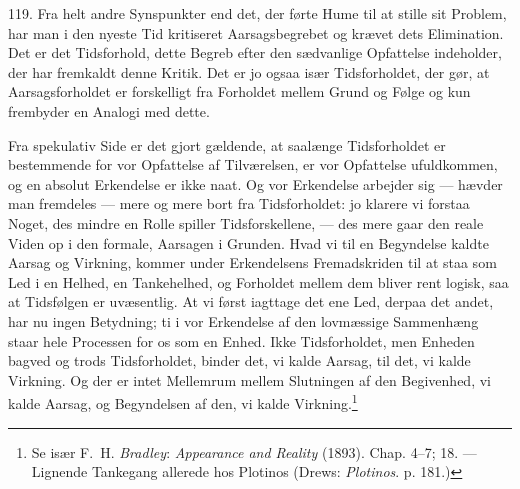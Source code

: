 \documentclass[12pt,a4paper]{book}
\newcommand{\apage}[1]{\marginnote{\footnotesize\textit{[#1]}}}
\begin{document}
119. Fra helt andre Synspunkter end det, der førte Hume til at stille sit Problem,
har man i den nyeste Tid kritiseret Aarsagsbegrebet og krævet dets Elimination. Det
er det Tidsforhold, dette Begreb efter den sædvanlige Opfattelse indeholder, der har
fremkaldt denne Kritik. Det er jo ogsaa især Tidsforholdet, der gør, at
Aarsagsforholdet er forskelligt fra Forholdet mellem Grund og Følge og kun frembyder
en Analogi med dette.

Fra spekulativ Side er det gjort gældende, at saalænge \apage{283} Tidsforholdet er bestemmende
for vor Opfattelse af Tilværelsen, er vor Opfattelse ufuldkommen, og en absolut
Erkendelse er ikke naat. Og vor Erkendelse arbejder sig --- hævder man fremdeles ---
mere og mere bort fra Tidsforholdet: jo klarere vi forstaa Noget, des mindre en
Rolle spiller Tidsforskellene, --- des mere gaar den reale Viden op i den formale,
Aarsagen i Grunden. Hvad vi til en Begyndelse kaldte Aarsag og Virkning, kommer
under Erkendelsens Fremadskriden til at staa som Led i en Helhed, en Tankehelhed, og
Forholdet mellem dem bliver rent logisk, saa at Tidsfølgen er uvæsentlig. At vi
først iagttage det ene Led, derpaa det andet, har nu ingen Betydning; ti i vor
Erkendelse af den lovmæssige Sammenhæng staar hele Processen for os som en Enhed.
Ikke Tidsforholdet, men Enheden bagved og trods Tidsforholdet, binder det, vi kalde
Aarsag, til det, vi kalde Virkning. Og der er intet Mellemrum mellem Slutningen af
den Begivenhed, vi kalde Aarsag, og Begyndelsen af den, vi kalde Virkning.\footnote{Se
især F.\ H. \emph{Bradley}: \emph{Appearance and Reality} (1893). Chap. 4--7; 18. ---
Lignende Tankegang allerede hos Plotinos (Drews: \emph{Plotinos}. p. 181.)}
\end{document}
